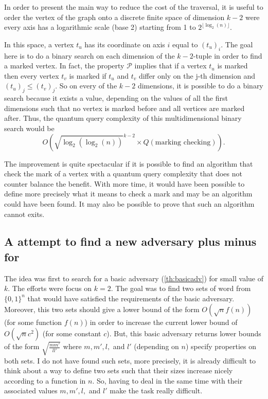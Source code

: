 In order to present the main way to reduce the cost of the traversal,
it is useful to order the vertex of the graph onto a discrete finite space
of dimension $k-2$ were every axis has a logarithmic scale (base 2) starting
from 1 to $2^{\lfloor \log_2(n) \rfloor}$.

In this space, a vertex $t_u$ has its coordinate on axis $i$ equal to $(t_u)_i$.
The goal here is to do a binary search on each dimension of the $k-2$-tuple
in order to find a marked vertex. In fact, the property $\mathcal{P}$ implies
that if a vertex $t_u$ is marked then every vertex $t_v$ is marked if $t_u$ and
$t_v$ differ only on the j-th dimension and $(t_u)_j\leq (t_v)_j$.
So on every of the $k-2$ dimensions, it is possible to do a binary search
because it exists a value, depending on the values of all the first dimensions
such that no vertex is marked before and all vertices are marked after.
Thus, the quantum query complexity of this multidimensional binary search
would be
\[O\left(\sqrt{\log_2(\log_2(n))}^{k-2} \times Q(\textrm{marking\ checking})\right).\]

The improvement is quite spectacular if it is possible to find an algorithm
that check the mark of a vertex with a quantum query complexity that does not
counter balance the benefit. With more time, it would have been possible to
define more precisely what it means to check a mark and may be an algorithm
could have been found. It may also be possible to prove that such an algorithm
cannot exits.

\subsection{A attempt to find a new adversary plus minus for }

The idea was first to search for a basic adversary (\autoref{th:basicadv})
for small value of $k$. The efforts were focus on $k=2$. The goal was to find
two sets of word from $\{0,1\}^n$ that would have satisfied the requirements
of the basic adversary. Moreover, this two sets should give a lower bound of
the form $O(\sqrt{n}f(n))$ (for some function $f(n)$) in order to increase
the current lower bound of $O(\sqrt{n}c^2)$ (for some constant $c$).
But, this basic adversary returns lower bounds of the form
$\sqrt{\frac{mm'}{ll'}}$ where $m,m',l,$ and $l'$ (depending on $n$)
specify properties on both sets. I do not have found such sets,
more precisely, it is already difficult to think about a way
to define two sets such that their sizes increase nicely according
to a function in $n$. So, having to deal in the same time with
their associated values $m,m',l,$ and $l'$ make the task really difficult.


